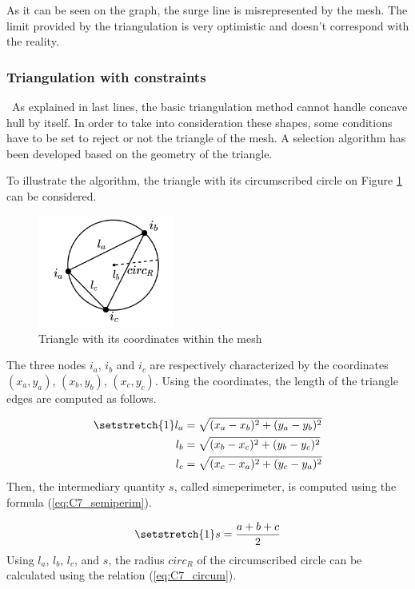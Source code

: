 As it can be seen on the graph, the surge line is misrepresented by the mesh. The limit provided by the triangulation is very optimistic and doesn't correspond with the reality. 

\subsubsection{Triangulation with constraints}
\quad\ As explained in last lines, the basic triangulation method cannot handle concave hull by itself. In order to take into consideration these shapes, some conditions have to be set to reject or not the triangle of the mesh. A selection algorithm  has been developed \cite{} based on the geometry of the triangle.

To illustrate the algorithm, the triangle with its circumscribed circle on Figure \ref{fig:C7_triangmesh} can be considered.

\begin{figure}[h]
    \centering
    \includegraphics[width=0.4\textwidth]{Comp_map/triang_mesh.png}
    \caption{Triangle with its coordinates within the mesh}
    \label{fig:C7_triangmesh}
\end{figure}

The three nodes $i_a$, $i_b$ and $i_c$ are respectively characterized by the coordinates $(x_a,y_a)$, $(x_b,y_b)$, $(x_c,y_c)$. Using the coordinates, the length of the triangle edges are computed as follows.

\begin{align*}
    \setstretch{1}
    l_a &= \sqrt{(x_a - x_b)^2 + (y_a - y_b)^2}\\
    l_b &= \sqrt{(x_b - x_c)^2 + (y_b - y_c)^2}\\
    l_c &= \sqrt{(x_c - x_a)^2 + (y_c - y_a)^2}
\end{align*}
Then, the intermediary quantity $s$, called simeperimeter, is computed using the formula (\ref{eq:C7_semiperim}).

\begin{equation}
    \setstretch{1}
    s = \frac{a + b + c}{2}\label{eq:C7_semiperim}
\end{equation}
Using $l_a$, $l_b$, $l_c$, and $s$, the radius $circ_R$ of the circumscribed circle can be calculated using the relation (\ref{eq:C7_circum}). 

